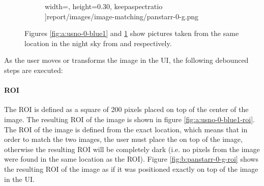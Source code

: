 \begin{figure}[H]
\begin{subfigure}{.5\textwidth}
            width=\textwidth,
            height=0.30\textheight,
            keepaspectratio
      ]{report/images/image-matching/panstarr-0-g.png}
      \caption{\panstarrs}
      \label{fig:b:panstarr-0-g}
    \end{subfigure}
    \caption{Figures \ref{fig:a:usno-0-blue1} and \ref{fig:b:panstarr-0-g} show pictures taken from the same location in the night sky from \usno and \panstarrs respectively.}
    \label{fig:mission-0}
\end{figure}

As the user moves or transforms the \panstarrs image in the UI, the following debounced steps are executed:

\paragraph{ROI} \label{paragraph:case-study:impl:roi}


The ROI is defined as a square of 200 pixels placed on top of the center of the \usno image. The resulting ROI of the \usno image is shown in figure \ref{fig:a:usno-0-blue1-roi}. The ROI of the \panstarrs image is defined from the exact location, which means that in order to match the two images, the user must place the \panstarrs on top of the \usno image, otherwise the resulting ROI will be completely dark (i.e. no pixels from the \panstarrs image were found in the same location as the \usno ROI). Figure \ref{fig:b:panstarr-0-g-roi} shows the resulting ROI of the \panstarrs image as if it was positioned exactly on top of the \usno image in the UI.

